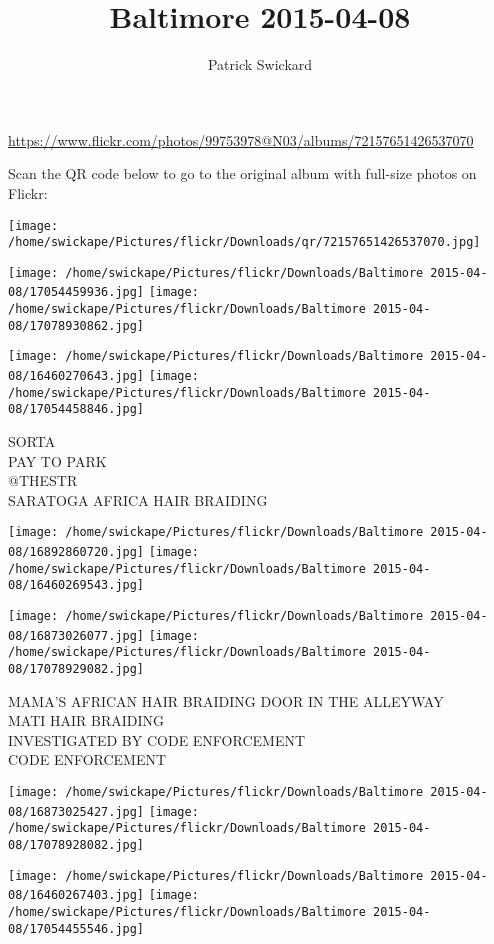 \documentclass[10pt,letterpaper]{article}
\title{Baltimore 2015-04-08}
\author{Patrick Swickard}
\date{}
\begin{document}
\maketitle

\url{https://www.flickr.com/photos/99753978@N03/albums/72157651426537070}

Scan the QR code below to go to the original album with full-size photos on Flickr:

\texttt{[image: /home/swickape/Pictures/flickr/Downloads/qr/72157651426537070.jpg]}
\pagebreak

\texttt{[image: /home/swickape/Pictures/flickr/Downloads/Baltimore 2015-04-08/17054459936.jpg]}
\texttt{[image: /home/swickape/Pictures/flickr/Downloads/Baltimore 2015-04-08/17078930862.jpg]}

\texttt{[image: /home/swickape/Pictures/flickr/Downloads/Baltimore 2015-04-08/16460270643.jpg]}
\texttt{[image: /home/swickape/Pictures/flickr/Downloads/Baltimore 2015-04-08/17054458846.jpg]}

SORTA\\
PAY TO PARK\\
@THESTR\\
SARATOGA AFRICA HAIR BRAIDING
\pagebreak

\texttt{[image: /home/swickape/Pictures/flickr/Downloads/Baltimore 2015-04-08/16892860720.jpg]}
\texttt{[image: /home/swickape/Pictures/flickr/Downloads/Baltimore 2015-04-08/16460269543.jpg]}

\texttt{[image: /home/swickape/Pictures/flickr/Downloads/Baltimore 2015-04-08/16873026077.jpg]}
\texttt{[image: /home/swickape/Pictures/flickr/Downloads/Baltimore 2015-04-08/17078929082.jpg]}

MAMA'S AFRICAN HAIR BRAIDING DOOR IN THE ALLEYWAY\\
MATI HAIR BRAIDING\\
INVESTIGATED BY CODE ENFORCEMENT\\
CODE ENFORCEMENT
\pagebreak

\texttt{[image: /home/swickape/Pictures/flickr/Downloads/Baltimore 2015-04-08/16873025427.jpg]}
\texttt{[image: /home/swickape/Pictures/flickr/Downloads/Baltimore 2015-04-08/17078928082.jpg]}

\texttt{[image: /home/swickape/Pictures/flickr/Downloads/Baltimore 2015-04-08/16460267403.jpg]}
\texttt{[image: /home/swickape/Pictures/flickr/Downloads/Baltimore 2015-04-08/17054455546.jpg]}
\end{document}
